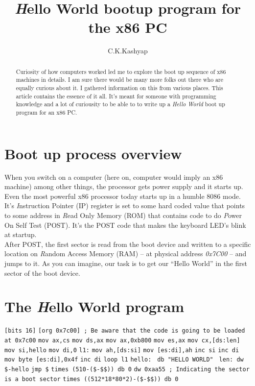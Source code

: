 \documentclass{article}
\begin{document}
\title{{\emph Hello World} bootup program for the x86 PC}
\author{C.K.Kashyap}
\maketitle

\begin{abstract}
Curiosity of how computers worked led me to explore the boot up sequence of x86
machines in details. I am sure there would be many more folks out there who are
equally curious about it. I gathered information on this from various places.
This article contains the essence of it all. It's meant for someone with
programming knowledge and a lot of curiousity to be able to to write up a
{\it Hello World} boot up program for an x86 PC.
\end{abstract}

\section*{Boot up process overview} When you switch on a computer (here on,
		computer would imply an x86 machine) among other things, the
processor gets power supply and it starts up.  Even the most powerful x86
processor today starts up in a humble 8086 mode. It's {\emph Instruction
	Pointer (IP)} register is set to some hard coded value that points to
	some address in {\emph Read Only Memory (ROM)} that contains code to do
{\emph Power On Self Test (POST)}. It's the POST code that makes the keyboard
LED's blink at startup.\\ After POST, the first sector is read from the boot
device and written to a specific location on {\emph Random Access Memory (RAM)}
-- at physical address {\it0x7C00} -- and jumps to it. As you can imagine, our
task is to get our ``Hello World'' in the first sector of the boot device.\\

\section*{The {\emph Hello World} program}

\texttt{[bits 16]}\break
\texttt{[org 0x7c00] ; Be aware that the code is going to be loaded at 0x7c00}\break
\texttt{}\break
\texttt{mov ax,cs}\break
\texttt{mov ds,ax}\break
\texttt{mov ax,0xb800}\break
\texttt{mov es,ax}\break
\texttt{}\break
\texttt{mov cx,[ds:len]}\break
\texttt{mov si,hello}\break
\texttt{mov di,0}\break
\texttt{l1:}\break
\texttt{mov ah,[ds:si]}\break
\texttt{mov [es:di],ah}\break
\texttt{inc si}\break
\texttt{inc di}\break
\texttt{mov byte [es:di],0x4f}\break
\texttt{inc di}\break
\texttt{loop l1}\break
\texttt{}\break
\texttt{hello:}\break
\texttt{	db "HELLO WORLD"  }\break
\texttt{len: 	dw \$-hello}\break
\texttt{}\break
\texttt{jmp \$}\break
\texttt{}\break
\texttt{times (510-(\$-\$\$)) db 0}\break
\texttt{dw 0xaa55 ; Indicating the sector is a boot sector}\break
\texttt{}\break
\texttt{times ((512*18*80*2)-(\$-\$\$)) db 0}\break
\end{document}
